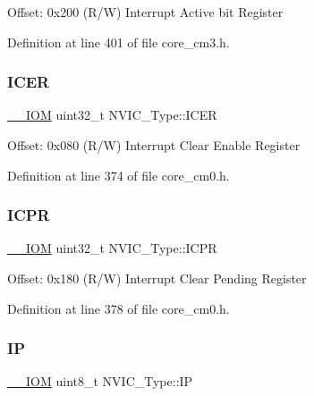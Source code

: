 Offset\+: 0x200 (R/W) Interrupt Active bit Register 

Definition at line 401 of file core\+\_\+cm3.\+h.

\mbox{\label{struct_n_v_i_c___type_a42e4007004da61e226adb251ac73f586}} 
\subsubsection{\texorpdfstring{I\+C\+ER}{ICER}}
{\footnotesize\ttfamily \hyperlink{core__sc300_8h_ab6caba5853a60a17e8e04499b52bf691}{\+\_\+\+\_\+\+I\+OM} uint32\+\_\+t N\+V\+I\+C\+\_\+\+Type\+::\+I\+C\+ER}

Offset\+: 0x080 (R/W) Interrupt Clear Enable Register 

Definition at line 374 of file core\+\_\+cm0.\+h.

\mbox{\label{struct_n_v_i_c___type_acf8209acf3f339d8eb2df9d3faaa10ae}} 
\subsubsection{\texorpdfstring{I\+C\+PR}{ICPR}}
{\footnotesize\ttfamily \hyperlink{core__sc300_8h_ab6caba5853a60a17e8e04499b52bf691}{\+\_\+\+\_\+\+I\+OM} uint32\+\_\+t N\+V\+I\+C\+\_\+\+Type\+::\+I\+C\+PR}

Offset\+: 0x180 (R/W) Interrupt Clear Pending Register 

Definition at line 378 of file core\+\_\+cm0.\+h.

\mbox{\label{struct_n_v_i_c___type_a4eef47929a0d1317a107f1ac62e28464}} 
\subsubsection{\texorpdfstring{IP}{IP}\hspace{0.1cm}{\footnotesize\ttfamily [1/2]}}
{\footnotesize\ttfamily \hyperlink{core__sc300_8h_ab6caba5853a60a17e8e04499b52bf691}{\+\_\+\+\_\+\+I\+OM} uint8\+\_\+t N\+V\+I\+C\+\_\+\+Type\+::\+IP}

